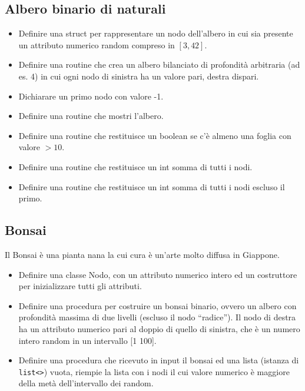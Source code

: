 \documentclass{article}
\begin{document}
\subsection{Albero binario di naturali}
	\begin{itemize}
	\item Definire una struct per rappresentare un nodo dell'albero in cui sia presente un attributo numerico random compreso in $[3, 42]$.
	\item Definire una routine che crea un albero bilanciato di profondità arbitraria (ad es. 4) in cui ogni nodo di sinistra ha un valore pari, destra dispari.
	\item Dichiarare un primo nodo con valore -1.
	\item Definire una routine che mostri l'albero.
	\item Definire una routine che restituisce un boolean se c'è almeno una foglia con valore $>10$.
	\item Definire una routine che restituisce un int somma di tutti i nodi.
	\item Definire una routine che restituisce un int somma di tutti i nodi escluso il primo.
	\end{itemize}
	
\subsection{Bonsai}
Il Bonsai è una pianta nana la cui cura è un'arte molto diffusa in Giappone.
	\begin{itemize}
    	\item Definire una classe Nodo, con un attributo numerico intero ed un costruttore per inizializzare tutti gli attributi.
	\item Definire una procedura per costruire un bonsai binario, ovvero un albero con profondità massima di due livelli (escluso il nodo “radice”). Il nodo di destra ha un attributo numerico pari al doppio di quello di sinistra, che è un numero intero random in un intervallo [1 100].
    	\item Definire una procedura che ricevuto in input il bonsai ed una lista (istanza di \texttt{list<>}) vuota, riempie la lista con i nodi il cui valore numerico è maggiore della metà dell'intervallo dei random.
    	\end{itemize}
    	
    	
\end{document}
